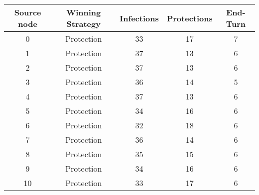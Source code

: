 \documentclass[results.tex]{subfiles}
\begin{document}
    \begin{center}
        \begin{tabular}{| c || c | c | c | c |}
            \hline
            {\bfseries Source node} & {\bfseries Winning Strategy} & {\bfseries Infections} & {\bfseries Protections}
            & {\bfseries End-Turn}
            \\  %
            \hline\hline
            0                       & Protection                   & 33                     & 17                      & 7                    \\
            \hline
            1                       & Protection                   & 37                     & 13                      & 6                    \\
            \hline
            2                       & Protection                   & 37                     & 13                      & 6                    \\
            \hline
            3                       & Protection                   & 36                     & 14                      & 5                    \\
            \hline
            4                       & Protection                   & 37                     & 13                      & 6                    \\
            \hline
            5                       & Protection                   & 34                     & 16                      & 6                    \\
            \hline
            6                       & Protection                   & 32                     & 18                      & 6                    \\
            \hline
            7                       & Protection                   & 36                     & 14                      & 6                    \\
            \hline
            8                       & Protection                   & 35                     & 15                      & 6                    \\
            \hline
            9                       & Protection                   & 34                     & 16                      & 6                    \\
            \hline
            10                      & Protection                   & 33                     & 17                      & 6                    \\

\end{tabular}
\end{center}
\end{document}
